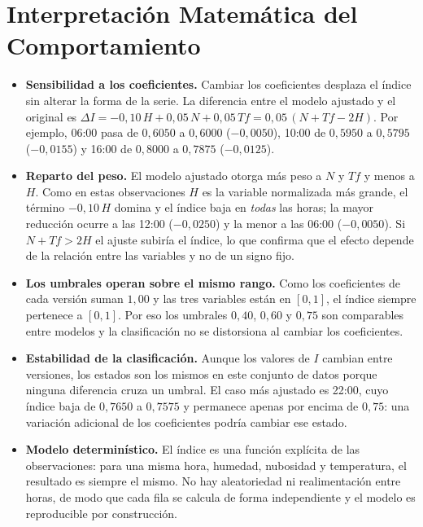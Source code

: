 \documentclass[11pt,a4paper]{article}
\begin{document}
\section{Interpretaci\'on Matem\'atica del Comportamiento}

\begin{itemize}[leftmargin=*]
  \item \textbf{Sensibilidad a los coeficientes.} Cambiar los coeficientes desplaza el
        \'indice sin alterar la forma de la serie. La diferencia entre el modelo ajustado y
        el original es $\Delta I = -0{,}10\,H + 0{,}05\,N + 0{,}05\,Tf
        = 0{,}05\,(N + Tf - 2H)$. Por ejemplo, 06:00 pasa de $0{,}6050$ a $0{,}6000$
        ($-0{,}0050$), 10:00 de $0{,}5950$ a $0{,}5795$ ($-0{,}0155$) y 16:00 de
        $0{,}8000$ a $0{,}7875$ ($-0{,}0125$).
  \item \textbf{Reparto del peso.} El modelo ajustado otorga m\'as peso a $N$ y $Tf$ y
        menos a $H$. Como en estas observaciones $H$ es la variable normalizada m\'as
        grande, el t\'ermino $-0{,}10\,H$ domina y el \'indice baja en \emph{todas} las
        horas; la mayor reducci\'on ocurre a las 12:00 ($-0{,}0250$) y la menor a las
        06:00 ($-0{,}0050$). Si $N + Tf > 2H$ el ajuste subir\'ia el \'indice, lo que
        confirma que el efecto depende de la relaci\'on entre las variables y no de un
        signo fijo.
  \item \textbf{Los umbrales operan sobre el mismo rango.} Como los coeficientes de cada
        versi\'on suman $1{,}00$ y las tres variables est\'an en $[0,1]$, el \'indice
        siempre pertenece a $[0,1]$. Por eso los umbrales $0{,}40$, $0{,}60$ y $0{,}75$
        son comparables entre modelos y la clasificaci\'on no se distorsiona al cambiar
        los coeficientes.
  \item \textbf{Estabilidad de la clasificaci\'on.} Aunque los valores de $I$ cambian
        entre versiones, los estados son los mismos en este conjunto de datos porque
        ninguna diferencia cruza un umbral. El caso m\'as ajustado es 22:00, cuyo
        \'indice baja de $0{,}7650$ a $0{,}7575$ y permanece apenas por encima de
        $0{,}75$: una variaci\'on adicional de los coeficientes podr\'ia cambiar ese
        estado.
  \item \textbf{Modelo determin\'istico.} El \'indice es una funci\'on expl\'icita de las
        observaciones: para una misma hora, humedad, nubosidad y temperatura, el
        resultado es siempre el mismo. No hay aleatoriedad ni realimentaci\'on entre
        horas, de modo que cada fila se calcula de forma independiente y el modelo es
        reproducible por construcci\'on.
\end{itemize}
\end{document}
